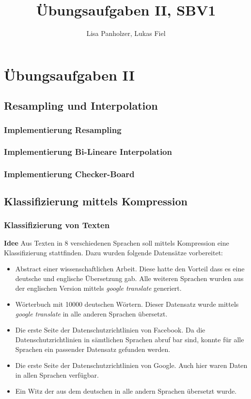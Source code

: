 \documentclass[12pt,german]{article}
\begin{document}
\title{Übungsaufgaben II, SBV1 }
\author{Lisa Panholzer, Lukas Fiel}
\maketitle


\newpage
\section{Übungsaufgaben II}
\subsection{Resampling und Interpolation}
\subsubsection{Implementierung Resampling}

\subsubsection{Implementierung Bi-Lineare Interpolation}

\subsubsection{Implementierung Checker-Board}

\subsection{Klassifizierung mittels Kompression}
\subsubsection{Klassifizierung von Texten}

\textbf{Idee}
Aus Texten in 8 verschiedenen Sprachen soll mittels Kompression eine Klassifizierung stattfinden. Dazu wurden folgende Datensätze vorbereitet:

\begin{itemize}
	\item Abstract einer wissenschaftlichen Arbeit. Diese hatte den Vorteil dass es eine deutsche und englische Übersetzung gab. Alle weiteren Sprachen wurden aus der englischen Version mittels \textit{google translate} generiert.
	\item Wörterbuch mit 10000 deutschen Wörtern. Dieser Datensatz wurde mittels \textit{google translate} in alle anderen Sprachen übersetzt.
	\item Die erste Seite der Datenschutzrichtlinien von Facebook. Da die Datenschutzrichtlinien in sämtlichen Sprachen abruf bar sind, konnte für alle Sprachen ein passender Datensatz gefunden werden.
	\item Die erste Seite der Datenschutzrichtlinien von Google. Auch hier waren Daten in allen Sprachen verfügbar.
	\item Ein Witz der aus dem deutschen in alle andern Sprachen übersetzt wurde.
\end{itemize}
\end{document}
